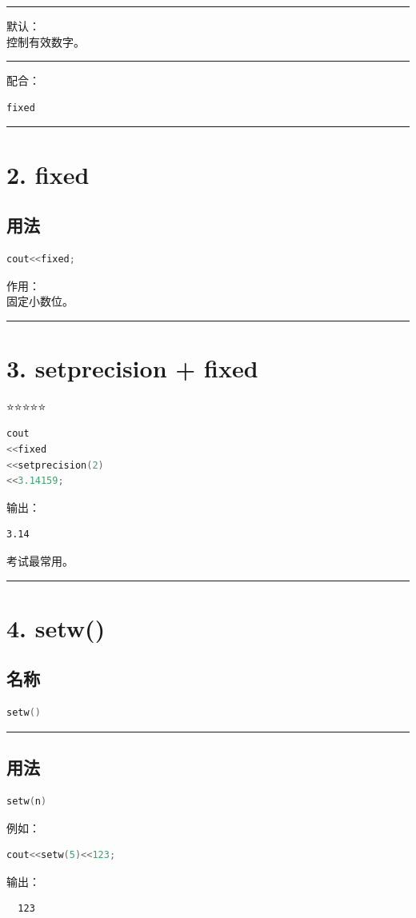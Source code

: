 \documentclass[9pt,twocolumn]{extarticle}
\begin{document}
\noindent\rule{\linewidth}{0.4pt}

默认：\\
控制有效数字。

\noindent\rule{\linewidth}{0.4pt}

配合：
\begin{lstlisting}[language=C++]
fixed
\end{lstlisting}

\noindent\rule{\linewidth}{0.4pt}

\section{2. fixed}

\subsection{用法}
\begin{lstlisting}[language=C++]
cout<<fixed;
\end{lstlisting}
作用：\\
固定小数位。

\noindent\rule{\linewidth}{0.4pt}

\section{3. setprecision + fixed}

⭐⭐⭐⭐⭐

\begin{lstlisting}[language=C++]
cout
<<fixed
<<setprecision(2)
<<3.14159;
\end{lstlisting}
输出：
\begin{lstlisting}
3.14
\end{lstlisting}
考试最常用。

\noindent\rule{\linewidth}{0.4pt}

\section{4. setw()}

\subsection{名称}
\begin{lstlisting}[language=C++]
setw()
\end{lstlisting}

\noindent\rule{\linewidth}{0.4pt}

\subsection{用法}
\begin{lstlisting}[language=C++]
setw(n)
\end{lstlisting}
例如：
\begin{lstlisting}[language=C++]
cout<<setw(5)<<123;
\end{lstlisting}
输出：
\begin{lstlisting}
  123
\end{lstlisting}
\end{document}
